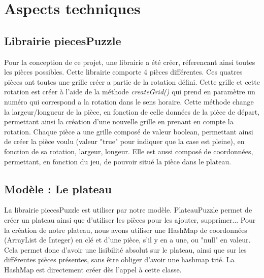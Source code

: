 \chapter{Aspects techniques}

	\section{Librairie piecesPuzzle}

        Pour la conception de ce projet, une librairie a été créer, réferencant ainsi toutes les pièces possibles. Cette librairie comporte 4 pièces différentes. Ces quatres pièces ont toutes une grille créer a partie de la rotation défini. Cette grille et cette rotation est créer à l'aide de la méthode \textit{createGrid()} qui prend en paramètre un numéro qui correspond a la rotation dans le sens horaire. Cette méthode change la largeur/longueur de la pièce, en fonction de celle données de la pièce de départ, permettant ainsi la création d'une nouvelle grille en prenant en compte la rotation.
        Chaque pièce a une grille composé de valeur boolean, permettant ainsi de créer la pièce voulu (valeur "true" pour indiquer que la case est pleine), en fonction de sa rotation, largeur, longeur. Elle est aussi composé de coordonnées, permettant, en fonction du jeu, de pouvoir situé la pièce dans le plateau.

    \section{Modèle : Le plateau}

        La librairie piecesPuzzle est utiliser par notre modèle. PlateauPuzzle permet de créer un plateau ainsi que d'utiliser les pièces pour les ajouter, supprimer...
        Pour la création de notre plateau, nous avons utiliser une HashMap de coordonnées (ArrayList de Integer) en clé et d'une pièce, s'il y en a une, ou "null" en valeur. Cela permet donc d'avoir une lisibilité absolut sur le plateau, ainsi que sur les différentes pièces présentes, sans être obliger d'avoir une hashmap trié.
        La HashMap est directement créer dès l'appel à cette classe.

